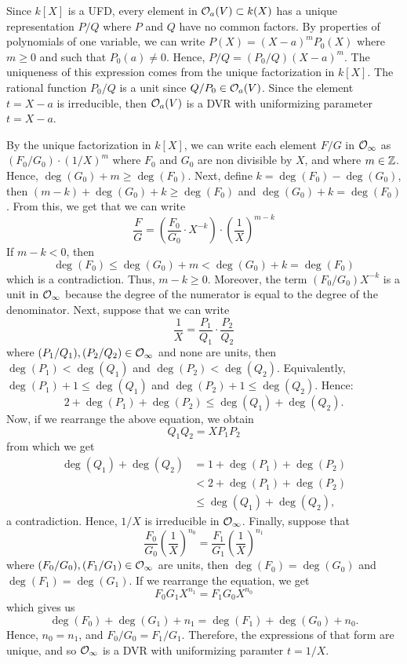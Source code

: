 \begin{solution}
    Since $k[X]$ is a UFD, every element in $\mathcal{O}_a(V) \subset k(X)$ has a unique representation $P/Q$ where $P$ and $Q$ have no common factors. By properties of polynomials of one variable, we can write $P(X) = (X-a)^m P_0(X)$ where $m \geq 0$ and such that $P_0(a) \neq 0$. Hence, $P/Q = (P_0/Q)(X-a)^m$. The uniqueness of this expression comes from the unique factorization in $k[X]$. The rational function $P_0/Q$ is a unit since $Q/P_0 \in \mathcal{O}_a(V)$. Since the element $t = X-a$ is irreducible, then $\mathcal{O}_a(V)$ is a DVR with uniformizing parameter $t = X-a$.
    
    By the unique factorization in $k[X]$, we can write each element $F/G$ in $\mathcal{O}_{\infty}$ as $(F_0/G_0)\cdot (1/X)^m$ where $F_0$ and $G_0$ are non divisible by $X$, and where $m \in \mathbb{Z}$. Hence, $\deg(G_0) + m \geq \deg(F_0)$. Next, define $k = \deg(F_0) - \deg(G_0)$, then $(m-k) + \deg(G_0) + k \geq \deg(F_0)$ and $\deg(G_0) + k = \deg(F_0)$. From this, we get that we can write 
    $$\frac{F}{G} = \left(\frac{F_0}{G_0}\cdot X^{-k}\right)\cdot \left(\frac{1}{X}\right)^{m-k}$$
    If $m - k < 0$, then
    $$\deg(F_0) \leq \deg(G_0) + m < \deg(G_0) + k = \deg(F_0)$$
    which is a contradiction. Thus, $m - k \geq 0$. Moreover, the term $(F_0/G_0)X^{-k}$ is a unit in $\mathcal{O}_{\infty}$ because the degree of the numerator is equal to the degree of the denominator. Next, suppose that we can write
    $$\frac{1}{X} = \frac{P_1}{Q_1}\cdot \frac{P_2}{Q_2}$$
    where $(P_1/Q_1), (P_2/Q_2) \in \mathcal{O}_{\infty}$ and none are units, then $\deg(P_1) < \deg(Q_1)$ and $\deg(P_2) < \deg(Q_2)$. Equivalently, $\deg(P_1) + 1 \leq \deg(Q_1)$ and $\deg(P_2) + 1 \leq \deg(Q_2)$. Hence:
    $$2 + \deg(P_1) + \deg(P_2) \leq \deg(Q_1) + \deg(Q_2).$$
    Now, if we rearrange the above equation, we obtain
    $$Q_1 Q_2 = XP_1P_2$$
    from which we get
    \begin{align*}
        \deg(Q_1) + \deg(Q_2) &= 1 + \deg(P_1) + \deg(P_2) \\
        &< 2 + \deg(P_1) + \deg(P_2) \\
        &\leq \deg(Q_1) + \deg(Q_2),
    \end{align*}
    a contradiction. Hence, $1/X$ is irreducible in $\mathcal{O}_{\infty}$. Finally, suppose that
    $$\frac{F_0}{G_0}\left(\frac{1}{X}\right)^{n_0} = \frac{F_1}{G_1}\left(\frac{1}{X}\right)^{n_1}$$
    where $(F_0/G_0), (F_1/G_1) \in \mathcal{O}_{\infty}$ are units, then $\deg(F_0) = \deg(G_0)$ and $\deg(F_1) = \deg(G_1)$. If we rearrange the equation, we get
    $$F_0G_1X^{n_1} = F_1G_0X^{n_0}$$
    which gives us
    $$\deg(F_0) + \deg(G_1) + n_1 = \deg(F_1) + \deg(G_0) + n_0.$$
    Hence, $n_0 = n_1$, and $F_0/G_0 = F_1/G_1$. Therefore, the expressions of that form are unique, and so $\mathcal{O}_{\infty}$ is a DVR with uniformizing paramter $t = 1/X$. \\
\end{solution}

